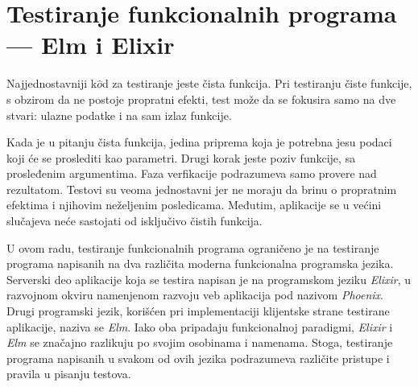 \documentclass[12pt,oneside]{memoir}
\begin{document}
\section{Testiranje funkcionalnih programa --- Elm i Elixir}
\label{sec:elmopste}

\par Najjednostavniji k$\hat{o}$d za testiranje jeste čista funkcija. Pri testiranju čiste funkcije, s obzirom da ne postoje propratni efekti, test može da se fokusira samo na dve stvari: ulazne podatke i na sam izlaz funkcije. 
\par Kada je u pitanju čista funkcija, jedina priprema koja je potrebna jesu podaci koji će se proslediti kao parametri. Drugi korak jeste poziv funkcije, sa prosleđenim argumentima. Faza verfikacije podrazumeva samo provere nad rezultatom. Testovi su veoma jednostavni jer ne moraju da brinu o propratnim efektima i njihovim neželjenim posledicama. Međutim, aplikacije se u većini slučajeva neće sastojati od isključivo čistih funkcija.
\par U ovom radu, testiranje funkcionalnih programa ograničeno je na testiranje programa napisanih na dva različita moderna funkcionalna programska jezika. Serverski deo aplikacije koja se testira napisan je na programskom jeziku \emph{Elixir}, u razvojnom okviru namenjenom razvoju veb aplikacija pod nazivom \emph{Phoenix}. Drugi programski jezik, korišćen pri implementaciji klijentske strane testirane aplikacije, naziva se \emph{Elm}. Iako oba pripadaju funkcionalnoj paradigmi, \emph{Elixir} i \emph{Elm} se značajno razlikuju po svojim osobinama i namenama. Stoga, testiranje programa napisanih u svakom od ovih jezika podrazumeva različite pristupe i pravila u pisanju testova.   
\end{document}
